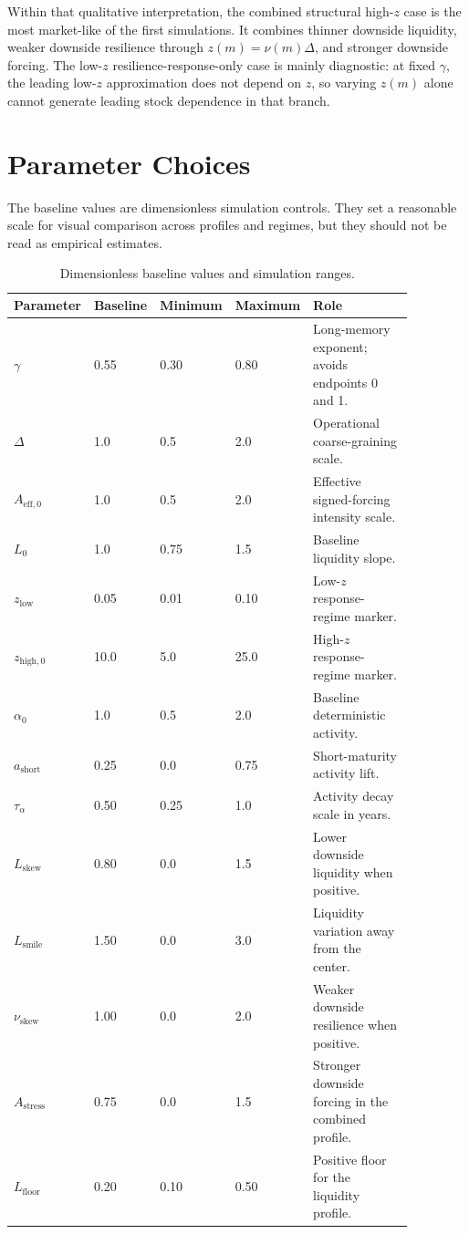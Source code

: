 \documentclass[11pt]{article}
\begin{document}
Within that qualitative interpretation, the combined structural high-\(z\)
case is the most market-like of the first simulations. It combines thinner
downside liquidity, weaker downside resilience through \(z(m)=\nu(m)\Delta\),
and stronger downside forcing. The low-\(z\) resilience-response-only case is
mainly diagnostic: at fixed \(\gamma\), the leading low-\(z\) approximation
does not depend on \(z\), so varying \(z(m)\) alone cannot generate leading
stock dependence in that branch.

\section{Parameter Choices}

The baseline values are dimensionless simulation controls. They set a
reasonable scale for visual comparison across profiles and regimes, but they
should not be read as empirical estimates.

\begin{table}[ht]
\centering
\small
\caption{Dimensionless baseline values and simulation ranges.}
\label{tab:parameter-ranges}
\begin{tabular}{p{0.18\linewidth}p{0.13\linewidth}p{0.13\linewidth}p{0.13\linewidth}p{0.30\linewidth}}
\toprule
Parameter & Baseline & Minimum & Maximum & Role \\
\midrule
\(\gamma\) & 0.55 & 0.30 & 0.80 & Long-memory exponent; avoids endpoints 0 and 1. \\
\(\Delta\) & 1.0 & 0.5 & 2.0 & Operational coarse-graining scale. \\
\(A_{\mathrm{eff},0}\) & 1.0 & 0.5 & 2.0 & Effective signed-forcing intensity scale. \\
\(L_0\) & 1.0 & 0.75 & 1.5 & Baseline liquidity slope. \\
\(z_{\mathrm{low}}\) & 0.05 & 0.01 & 0.10 & Low-\(z\) response-regime marker. \\
\(z_{\mathrm{high},0}\) & 10.0 & 5.0 & 25.0 & High-\(z\) response-regime marker. \\
\(\alpha_0\) & 1.0 & 0.5 & 2.0 & Baseline deterministic activity. \\
\(a_{\mathrm{short}}\) & 0.25 & 0.0 & 0.75 & Short-maturity activity lift. \\
\(\tau_\alpha\) & 0.50 & 0.25 & 1.0 & Activity decay scale in years. \\
\(L_{\mathrm{skew}}\) & 0.80 & 0.0 & 1.5 & Lower downside liquidity when positive. \\
\(L_{\mathrm{smile}}\) & 1.50 & 0.0 & 3.0 & Liquidity variation away from the center. \\
\(\nu_{\mathrm{skew}}\) & 1.00 & 0.0 & 2.0 & Weaker downside resilience when positive. \\
\(A_{\mathrm{stress}}\) & 0.75 & 0.0 & 1.5 & Stronger downside forcing in the combined profile. \\
\(L_{\mathrm{floor}}\) & 0.20 & 0.10 & 0.50 & Positive floor for the liquidity profile. \\
\bottomrule
\end{tabular}
\end{table}
\end{document}
